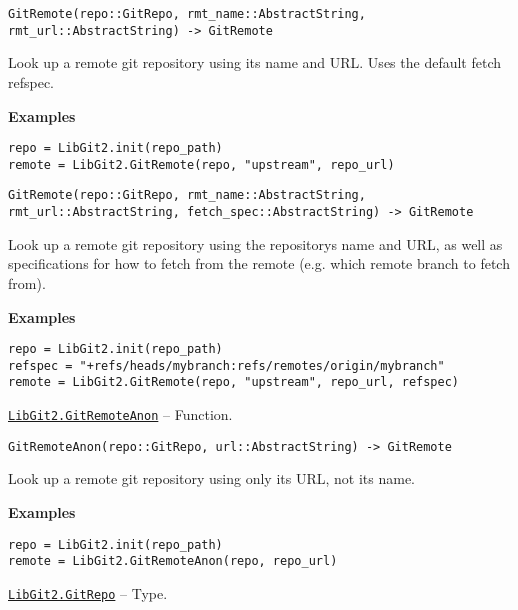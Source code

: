\begin{adjustwidth}{2em}{0pt}


\begin{verbatim}
GitRemote(repo::GitRepo, rmt_name::AbstractString, rmt_url::AbstractString) -> GitRemote
\end{verbatim}

Look up a remote git repository using its name and URL. Uses the default fetch refspec.

\textbf{Examples}


\begin{verbatim}
repo = LibGit2.init(repo_path)
remote = LibGit2.GitRemote(repo, "upstream", repo_url)
\end{verbatim}




\begin{lstlisting}
GitRemote(repo::GitRepo, rmt_name::AbstractString, rmt_url::AbstractString, fetch_spec::AbstractString) -> GitRemote
\end{lstlisting}

Look up a remote git repository using the repository{\textquotesingle}s name and URL, as well as specifications for how to fetch from the remote (e.g. which remote branch to fetch from).

\textbf{Examples}


\begin{verbatim}
repo = LibGit2.init(repo_path)
refspec = "+refs/heads/mybranch:refs/remotes/origin/mybranch"
remote = LibGit2.GitRemote(repo, "upstream", repo_url, refspec)
\end{verbatim}



\end{adjustwidth}
\hypertarget{13915605113589562056}{} 
\hyperlink{13915605113589562056}{\texttt{LibGit2.GitRemoteAnon}}  -- {Function.}

\begin{adjustwidth}{2em}{0pt}


\begin{verbatim}
GitRemoteAnon(repo::GitRepo, url::AbstractString) -> GitRemote
\end{verbatim}

Look up a remote git repository using only its URL, not its name.

\textbf{Examples}


\begin{verbatim}
repo = LibGit2.init(repo_path)
remote = LibGit2.GitRemoteAnon(repo, repo_url)
\end{verbatim}



\end{adjustwidth}
\hypertarget{3263346103236484748}{} 
\hyperlink{3263346103236484748}{\texttt{LibGit2.GitRepo}}  -- {Type.}

